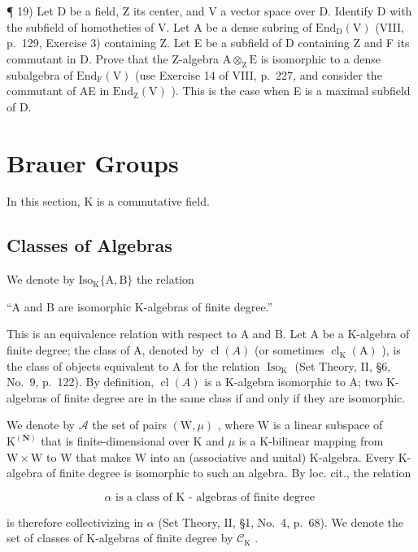 ¶ 19) Let D be a field, Z its center, and V a vector space over D. Identify D with the subfield of homotheties of V. Let A be a dense subring of \(\mathrm{End}_{\mathrm{D}}(\mathrm{V})\) (VIII, p.~129, Exercise 3) containing Z. Let E be a subfield of D containing Z and F its commutant in D. Prove that the Z-algebra \(\mathrm{A} \otimes_{\mathrm{Z}} \mathrm{E}\) is isomorphic to a dense subalgebra of \(\mathrm{End}_{\mathrm{F}}(\mathrm{V})\) (use Exercise 14 of VIII, p.~227, and consider the commutant of AE in \(\mathrm{End}_{\mathrm{Z}}(\mathrm{V})\) ). This is the case when E is a maximal subfield of D.

\section{Brauer Groups}

In this section, K is a commutative field.

\subsection{Classes of Algebras}

We denote by \(\mathrm{Iso}_{\mathrm{K}}\{\mathrm{A},\mathrm{B}\}\) the relation

``A and B are isomorphic K-algebras of finite degree.''

This is an equivalence relation with respect to A and B. Let A be a K-algebra of finite degree; the class of A, denoted by \(\operatorname{cl}(A)\) (or sometimes \(\operatorname{cl}_{\mathrm{K}}(\mathrm{A})\) ), is the class of objects equivalent to A for the relation \(\operatorname{Iso}_{\mathrm{K}}\) (Set Theory, II, §6, No.~9, p.~122). By definition, \(\operatorname{cl}(A)\) is a K-algebra isomorphic to A; two K-algebras of finite degree are in the same class if and only if they are isomorphic.

We denote by \(\mathcal{A}\) the set of pairs \((\mathrm{W},\mu)\) , where \(\mathrm{W}\) is a linear subspace of \(\mathrm{K}^{(\mathbf{N})}\) that is finite-dimensional over \(\mathrm{K}\) and \(\mu\) is a K-bilinear mapping from \(\mathrm{W} \times \mathrm{W}\) to \(\mathrm{W}\) that makes \(\mathrm{W}\) into an (associative and unital) K-algebra. Every K-algebra of finite degree is isomorphic to such an algebra. By loc. cit., the relation

\[
\alpha \text {   is   a   class   of   K - algebras   of   finite   degree }
\]

is therefore collectivizing in \(\alpha\) (Set Theory, II, §1, No.~4, p.~68). We denote the set of classes of K-algebras of finite degree by \(\mathcal{C}_{\mathrm{K}}\) .

